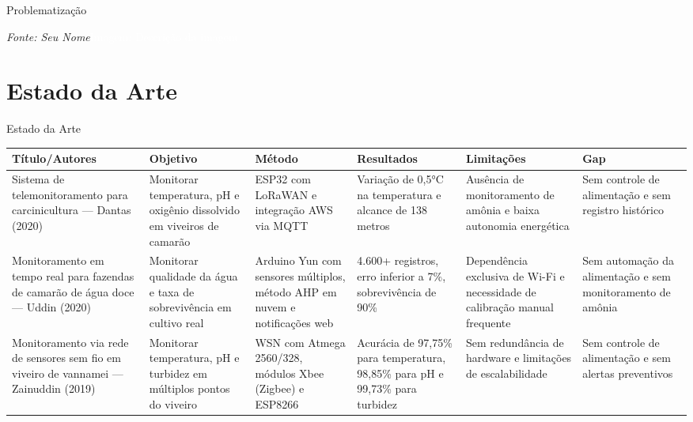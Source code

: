 \documentclass[aspectratio=169]{beamer}
\begin{document}
{{\begin{frame}[b]{Problematização}
  \vfill
  
  {\fontsize{4}{5}\selectfont\textit{Fonte: Seu Nome}\hfill\textcolor{white}{Imagem: Descrição da imagem}}
\end{frame}
}

\section{Estado da Arte}

{
\usebackgroundtemplate{}
\begin{frame}[t]{Estado da Arte}

\begin{table}
    \centering
    \tiny
    \begin{tabular}{|p{2.5cm}|p{2cm}|p{2cm}|p{2cm}|p{2cm}|p{1.5cm}|}
      \hline
      \textbf{Título/Autores} & \textbf{Objetivo} & \textbf{Método} & \textbf{Resultados} & \textbf{Limitações} & \textbf{Gap} \\
      \hline
      Sistema de telemonitoramento para carcinicultura — Dantas (2020) & Monitorar temperatura, pH e oxigênio dissolvido em viveiros de camarão & ESP32 com LoRaWAN e integração AWS via MQTT & Variação de 0,5°C na temperatura e alcance de 138 metros & Ausência de monitoramento de amônia e baixa autonomia energética & Sem controle de alimentação e sem registro histórico \\
      \hline
      Monitoramento em tempo real para fazendas de camarão de água doce — Uddin (2020) & Monitorar qualidade da água e taxa de sobrevivência em cultivo real & Arduino Yun com sensores múltiplos, método AHP em nuvem e notificações web & 4.600+ registros, erro inferior a 7\%, sobrevivência de 90\% & Dependência exclusiva de Wi-Fi e necessidade de calibração manual frequente & Sem automação da alimentação e sem monitoramento de amônia \\
      \hline
      Monitoramento via rede de sensores sem fio em viveiro de vannamei — Zainuddin (2019) & Monitorar temperatura, pH e turbidez em múltiplos pontos do viveiro & WSN com Atmega 2560/328, módulos Xbee (Zigbee) e ESP8266 & Acurácia de 97,75\% para temperatura, 98,85\% para pH e 99,73\% para turbidez & Sem redundância de hardware e limitações de escalabilidade & Sem controle de alimentação e sem alertas preventivos \\
      \hline
    \end{tabular}
  \end{table}
\end{frame}
}

}
\end{document}

